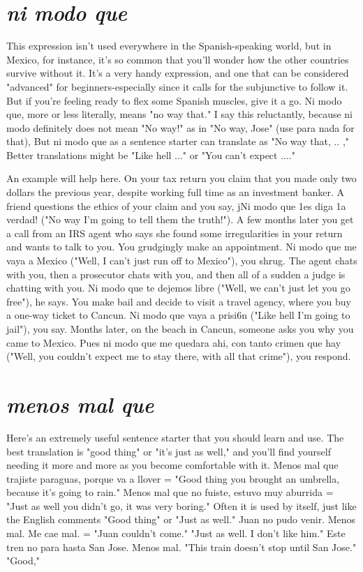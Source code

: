 \documentclass[14pt,a4paper,oneside]{memoir}
\begin{document}
\section{\emph{ni modo que}}

This expression isn't used everywhere in the Spanish-speaking
world, but in Mexico, for instance, it's so common that you'll wonder
how the other countries survive without it. It's a very handy expression, and one that can be considered "advanced" for beginners-especially since it calls for the subjunctive to follow it. But if you're feeling
ready to flex some Spanish muscles, give it a go. Ni modo que, more or
less literally, means "no way that." I say this reluctantly, because ni
modo definitely does not mean "No way!" as in "No way, Jose" (use
para nada for that), But ni modo que as a sentence starter can translate as "No way that, .. ," Better translations might be "Like hell ..."
or "You can't expect ...."

An example will help here. On your tax return you claim that
you made only two dollars the previous year, despite working full time
as an investment banker. A friend questions the ethics of your claim
and you say, jNi modo que 1es diga 1a verdad! ("No way I'm going to
tell them the truth!"). A few months later you get a call from an IRS
agent who says she found some irregularities in your return and wants
to talk to you. You grudgingly make an appointment. Ni modo que me
vaya a Mexico ("Well, I can't just run off to Mexico"), you shrug. The
agent chats with you, then a prosecutor chats with you, and then all of
a sudden a judge is chatting with you. Ni modo que te dejemos libre
("Well, we can't just let you go free"), he says. You make bail and decide to visit a travel agency, where you buy a one-way ticket to Cancun. Ni modo que vaya a prisi6n ("Like hell I'm going to jail"), you
say. Months later, on the beach in Cancun, someone asks you why you
came to Mexico. Pues ni modo que me quedara ahi, con tanto crimen
que hay ("Well, you couldn't expect me to stay there, with all that
crime"), you respond.

\section{\emph{menos mal que}}

Here's an extremely useful sentence starter that you should
learn and use. The best translation is "good thing" or "it's just as
well," and you'll find yourself needing it more and more as you become
comfortable with it. Menos mal que trajiste paraguas, porque va a
llover = "Good thing you brought an umbrella, because it's going to
rain." Menos mal que no fuiste, estuvo muy aburrida = "Just as well
you didn't go, it was very boring." Often it is used by itself, just like
the English comments "Good thing" or "Just as well." Juan no pudo
venir. Menos mal. Me cae mal. = "Juan couldn't come." "Just as well.
I don't like him." Este tren no para hasta San Jose. Menos mal.
"This train doesn't stop until San Jose." "Good,"
\end{document}
